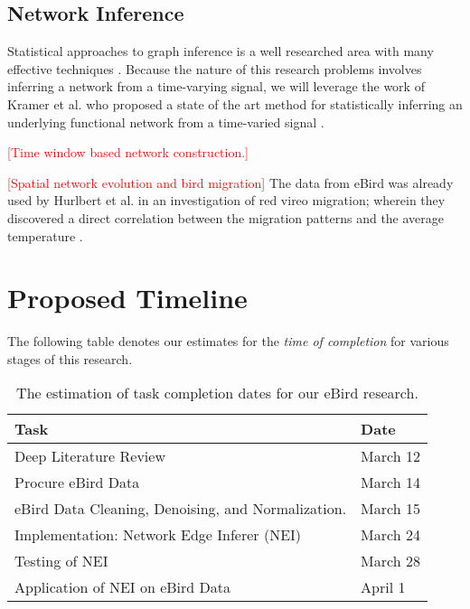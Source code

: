 \documentclass[11pt]{article}
\newcommand{\tod}[1]{\textcolor{red}{[#1]}}
\begin{document}
\begin{multicols}{2}
\subsection{Network Inference} 
Statistical approaches to graph inference is a well researched area with many effective techniques \cite{AlbertMechanics}. Because the nature of this research problems involves inferring a network from a time-varying signal, we will leverage the work of Kramer et al. who proposed a state of the art method for statistically inferring an underlying functional network from a time-varied signal \cite{kramer}.

\tod{Time window based network construction.}


\tod{Spatial network evolution and bird migration}
The data from eBird was already used by Hurlbert et al. in an investigation of red vireo migration; wherein they discovered a direct correlation between the migration patterns and the average temperature \cite{hurlbert}. 

\section{Proposed Timeline} \vspace{-10 pt}
The following table denotes our estimates for the \textit{time of completion} for various stages of this research.
\begin{table*}
\centering
\begin{tabular}{|ll|} \hline
Task & Date\\ \hline
Deep Literature Review & March 12  \\
Procure eBird Data & March 14 \\
eBird Data Cleaning, Denoising, and Normalization. & March 15 \\
Implementation: Network Edge Inferer (NEI) &March 24 \\
Testing of NEI & March 28  \\
Application of NEI on eBird Data & April 1 \\

\hline\end{tabular}
\caption{The estimation of task completion dates for our eBird research.}
\label{table:chart}
\end{table*}






\end{multicols}


\end{document}
